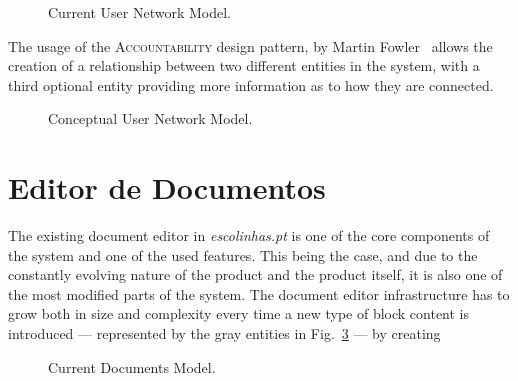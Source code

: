 \documentclass[9pt,a4paper]{extarticle}
\begin{document}
\begin{multicols}{2}
\begin{figure}[H]
  \caption{Current User Network Model.}
  \label{fig:social_network_current}
\end{figure}

The usage of the \textsc{Accountability} design pattern, by Martin Fowler~\cite{fowler_accountability} allows the creation of a relationship between two different entities in the system, with a third optional entity providing more information as to how they are connected.

\begin{figure}[H]
  \caption{Conceptual User Network Model.}
  \label{fig:social_network_conceptual}
\end{figure}

\section{Editor de Documentos}\label{sec:document_editor}

The existing document editor in \emph{escolinhas.pt} is one of the core components of the system and one of the used features. This being the case, and due to the constantly evolving nature of the product and the product itself, it is also one of the most modified parts of the system. The document editor infrastructure has to grow both in size and complexity every time a new type of block content is introduced --- represented by the gray entities in Fig.~\ref{fig:documents_current} --- by creating 

\begin{figure}[H]
  \caption{Current Documents Model.}
  \label{fig:documents_current}
\end{figure}


\end{multicols}
\end{document}
